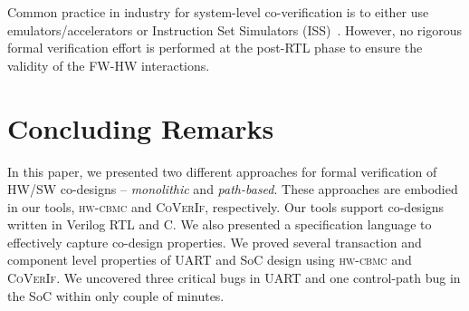 \documentclass[sigconf]{acmart}
\newcommand{\tool}[1]{\textsc{#1}\xspace}
\newcommand{\hwcbmcv}{\tool{hw-cbmc}}
\newcommand{\verifox}{\tool{CoVerIf}}
\newcommand{\Omit}[1]{}
\begin{document}
\Omit{
A system is comprised of a set of concurrent FW and HW models, which
interleave asynchronously.  Malik et al.~in~\cite{hvc} showed 
that these patterns are meaningful in further
settings -- a Linux device driver interacting with x86 QEMU emulator code or
a Rockbox firmware interacting with an iAudio X5 device.  Practical industrial 
co-designs, such as IBM Text Accelerator co-design~\cite{polig2014micro,polig2014fpl} 
and IBM coherent FFT coprocessor~\cite{giefers2015accelerating} also exhibits
producer-consumer interaction pattern. 
}
Common practice in industry for system-level co-verification is to 
either use emulators/accelerators or Instruction Set Simulators 
(ISS)~\cite{coverif-book}.  However, no rigorous formal verification 
effort is performed at the post-RTL phase to ensure the validity of the
FW-HW interactions.  

\Omit{
The concept of symbolic execution~\cite{DBLP:journals/tse/Clarke76,
DBLP:conf/pldi/GodefroidKS05, DBLP:conf/osdi/CadarDE08} is prevalent in the
software domain for automated test generation as well as bug finding.  This
technique is different from the symbolic simulation techniques that are used
in the hardware domain.  In this paper, we apply path-wise symbolic execution
to mine relevant scenario/transaction pairs for effective co-verification of 
a unified co-verification model.  
}
\section{Concluding Remarks}
%
In this paper, we presented two different approaches for formal verification of 
HW/SW co-designs -- \emph{monolithic} and \emph{path-based}.  These approaches are 
embodied in our tools, \hwcbmcv and \verifox, respectively.  Our tools support 
co-designs written in Verilog RTL and C.  We also presented a specification language to 
effectively capture co-design properties.  
We proved several transaction and component level properties of UART and SoC
design using \hwcbmcv and \verifox.  
We uncovered three critical bugs in UART and one control-path bug in the SoC 
within only couple of minutes. 
\end{document}
